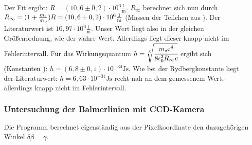 Der Fit ergibt: $R = (10,6 \pm 0,2)\cdot 10^6\frac{1}{\si{\metre}}$. $R_\infty$ berechnet sich nun durch $R_\infty = (1+\frac{m_\mathrm{e}}{m_\mathrm{p}}) R = (10,6 \pm 0,2)\cdot 10^6\frac{1}{\si{\metre}}$ (Massen der Teilchen aus \cite{wiki_konst}). Der Literaturwert \cite{wiki_konst} ist $10,97 \cdot 10^6\frac{1}{\si{\metre}}$. Unser Wert liegt also in der gleichen Größenordnung, wie der wahre Wert. Allerdings liegt dieser knapp nicht im Fehlerintervall. Für das Wirkungsquantum $h = \sqrt[3]{\cfrac{m_\mathrm{e}\mathrm{e}^4}{8\epsilon_0^2R_\infty c}}$ ergibt sich (Konstanten \cite{wiki_konst}): $h = (6,8 \pm 0,1) \cdot 10^{-34} \si{\joule \second}$. Wie bei der Rydbergkonstante liegt der Literaturwert: $h = 6,63 \cdot 10^{-34} \si{\joule \second}$ recht nah an dem gemessenem Wert, allerdings knapp nicht im Fehlerintervall.

\subsubsection{Untersuchung der Balmerlinien mit CCD-Kamera}
Die Programm berechnet eigenständig aus der Pixelkoordinate den dazugehörigen Winkel $\delta  \beta = \gamma$. 

